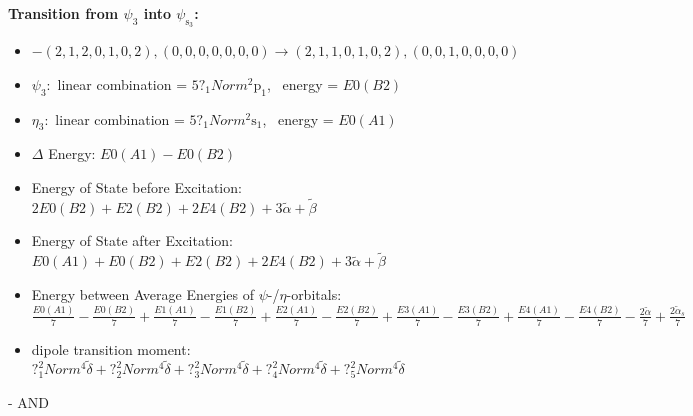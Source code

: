 \documentclass[12pt,a4paper]{article}
\begin{document}
        \noindent\textbf{Transition from $\psi_{3}$ into $\psi_{\text{s}_{3}}$:}
        \begin{itemize}
            \item $- (2, 1, 2, 0, 1, 0, 2), (0, 0, 0, 0, 0, 0, 0) \rightarrow (2, 1, 1, 0, 1, 0, 2), (0, 0, 1, 0, 0, 0, 0)$
        
            \item $\psi_{3}:$ linear combination = $5 ?_{1} Norm^{2} \text{p}_{1}$, \
            energy = $E0(B2)$
            
            \item $\eta_{3}:$ linear combination = $5 ?_{1} Norm^{2} \text{s}_{1}$, \
            energy = $E0(A1)$
            
                \item $\Delta$ Energy: $E0(A1) - E0(B2)$
                \item Energy of State before Excitation: $2 E0(B2) + E2(B2) + 2 E4(B2) + 3 \tilde{\alpha} + \tilde{\beta}$
                \item Energy of State after Excitation: $E0(A1) + E0(B2) + E2(B2) + 2 E4(B2) + 3 \tilde{\alpha} + \tilde{\beta}$
                \item Energy between Average Energies of $\psi$-/$\eta$-orbitals: $\frac{E0(A1)}{7} - \frac{E0(B2)}{7} + \frac{E1(A1)}{7} - \frac{E1(B2)}{7} + \frac{E2(A1)}{7} - \frac{E2(B2)}{7} + \frac{E3(A1)}{7} - \frac{E3(B2)}{7} + \frac{E4(A1)}{7} - \frac{E4(B2)}{7} - \frac{2 \tilde{\alpha}}{7} + \frac{2 \tilde{\alpha}_{s}}{7}$
            
            \item dipole transition moment: $?_{1}^{2} Norm^{4} \tilde{\delta} + ?_{2}^{2} Norm^{4} \tilde{\delta} + ?_{3}^{2} Norm^{4} \tilde{\delta} + ?_{4}^{2} Norm^{4} \tilde{\delta} + ?_{5}^{2} Norm^{4} \tilde{\delta}$
        
        \end{itemize}
        
 -  AND 
\end{document}
